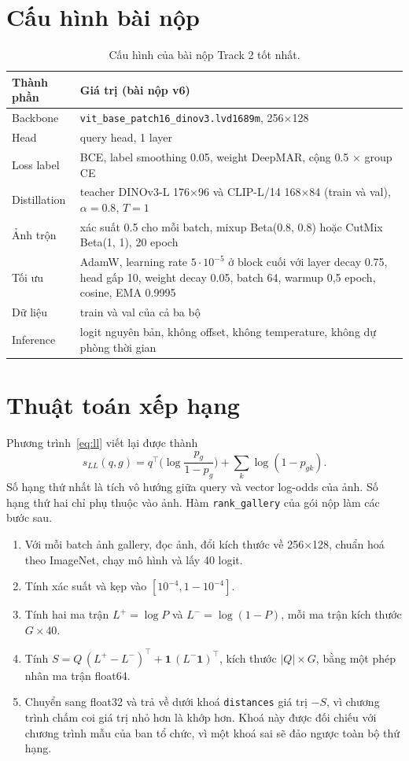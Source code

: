 \documentclass[11pt,a4paper]{article}
\begin{document}
\section{Cấu hình bài nộp}

\begin{table}[H]
\centering\small
\begin{tabularx}{\linewidth}{@{}lX@{}}
\toprule
Thành phần & Giá trị (bài nộp v6) \\
\midrule
Backbone & \texttt{vit\_base\_patch16\_dinov3.lvd1689m}, 256×128 \\
Head & query head, 1 layer \\
Loss label & BCE, label smoothing 0.05, weight DeepMAR, cộng 0.5 × group CE \\
Distillation & teacher DINOv3-L 176×96 và CLIP-L/14 168×84 (train và val), $\alpha=0.8$, $T=1$ \\
Ảnh trộn & xác suất 0.5 cho mỗi batch, mixup Beta(0.8, 0.8) hoặc CutMix Beta(1, 1), 20 epoch \\
Tối ưu & AdamW, learning rate $5\cdot10^{-5}$ ở block cuối với layer decay 0.75, head gấp 10, weight decay 0.05, batch 64, warmup 0,5 epoch, cosine, EMA 0.9995 \\
Dữ liệu & train và val của cả ba bộ \\
Inference & logit nguyên bản, không offset, không temperature, không dự phòng thời gian \\
\bottomrule
\end{tabularx}
\caption{Cấu hình của bài nộp Track 2 tốt nhất.}
\end{table}

\section{Thuật toán xếp hạng}
\label{app:algo}

Phương trình~\eqref{eq:ll} viết lại được thành
\begin{equation}
s_{LL}(q,g)=q^{\top}\Big(\log\frac{p_g}{1-p_g}\Big)+\sum_k\log(1-p_{gk}).
\end{equation}
Số hạng thứ nhất là tích vô hướng giữa query và vector log-odds của ảnh. Số hạng thứ hai chỉ phụ thuộc vào ảnh. Hàm \texttt{rank\_gallery} của gói nộp làm các bước sau.

\begin{enumerate}[leftmargin=1.6em]
\item Với mỗi batch ảnh gallery, đọc ảnh, đổi kích thước về 256×128, chuẩn hoá theo ImageNet, chạy mô hình và lấy 40 logit.
\item Tính xác suất và kẹp vào $[10^{-4},1-10^{-4}]$.
\item Tính hai ma trận $L^{+}=\log P$ và $L^{-}=\log(1-P)$, mỗi ma trận kích thước $G\times40$.
\item Tính $S=Q\,(L^{+}-L^{-})^{\top}+\mathbf{1}\,(L^{-}\mathbf{1})^{\top}$, kích thước $|Q|\times G$, bằng một phép nhân ma trận float64.
\item Chuyển sang float32 và trả về dưới khoá \texttt{distances} giá trị $-S$, vì chương trình chấm coi giá trị nhỏ hơn là khớp hơn. Khoá này được đối chiếu với chương trình mẫu của ban tổ chức, vì một khoá sai sẽ đảo ngược toàn bộ thứ hạng.
\end{enumerate}
\end{document}
